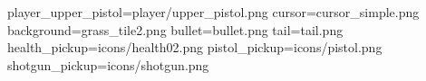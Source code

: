 player_upper_pistol=player/upper_pistol.png
cursor=cursor_simple.png
background=grass_tile2.png
bullet=bullet.png
tail=tail.png
health_pickup=icons/health02.png
pistol_pickup=icons/pistol.png
shotgun_pickup=icons/shotgun.png
